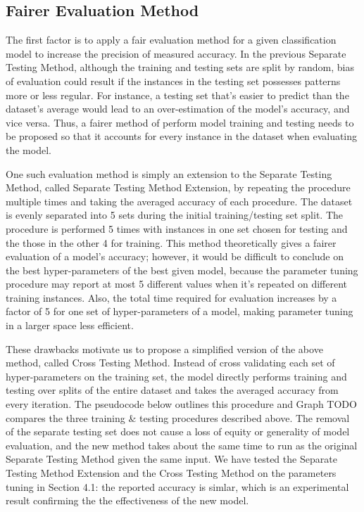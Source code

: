 \documentclass[letterpaper,twocolumn,10pt]{article}
\begin{document}
\subsection{Fairer Evaluation Method}

The first factor is to apply a fair evaluation method for a given classification model to increase the precision of measured accuracy. In the previous Separate Testing Method, although the training and testing sets are split by random, bias of evaluation could result if the instances in the testing set possesses patterns more or less regular. For instance, a testing set that's easier to predict than the dataset's average would lead to an over-estimation of the model's accuracy, and vice versa. Thus, a fairer method of perform model training and testing needs to be proposed so that it accounts for every instance in the dataset when evaluating the model. 

One such evaluation method is simply an extension to the Separate Testing Method, called Separate Testing Method Extension, by repeating the procedure multiple times and taking the averaged accuracy of each procedure. The dataset is evenly separated into 5 sets during the initial training/testing set split. The procedure is performed 5 times with instances in one set chosen for testing and the those in the other 4 for training. This method theoretically gives a fairer evaluation of a model's accuracy; however, it would be difficult to conclude on the best hyper-parameters of the best given model, because the parameter tuning procedure may report at most 5 different values when it's repeated on different training instances. Also, the total time required for evaluation increases by a factor of 5 for one set of hyper-parameters of a model, making parameter tuning in a larger space less efficient.

These drawbacks motivate us to propose a simplified version of the above method, called Cross Testing Method. Instead of cross validating each set of hyper-parameters on the training set, the model directly performs training and testing over splits of the entire dataset and takes the averaged accuracy from every iteration. The pseudocode below outlines this procedure and Graph TODO compares the three training \& testing procedures described above. The removal of the separate testing set does not cause a loss of equity or generality of model evaluation, and the new method takes about the same time to run as the original Separate Testing Method given the same input. We have tested the Separate Testing Method Extension and the Cross Testing Method on the parameters tuning in Section 4.1: the reported accuracy is simlar, which is an experimental result confirming the the effectiveness of the new model.
\end{document}
